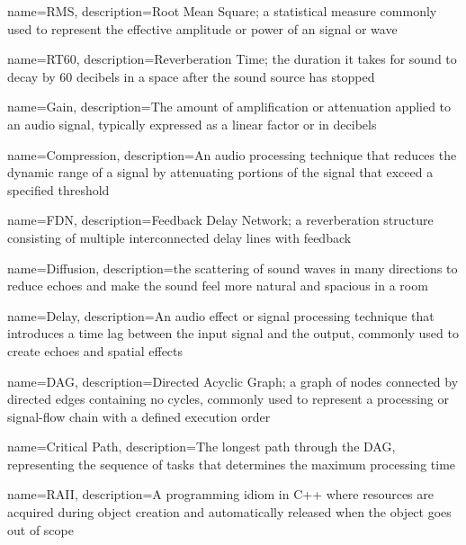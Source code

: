 {
    name={RMS},
    description={Root Mean Square; a statistical measure commonly used to represent the 
    effective amplitude or power of an signal or wave}
}

{
    name={RT60},
    description={Reverberation Time; the duration it takes for sound to decay by 60 decibels 
    in a space after the sound source has stopped}
}

{
    name={Gain},
    description={The amount of amplification or attenuation applied to an audio signal, typically expressed as a linear factor or in decibels}
}


{
    name={Compression},
    description={An audio processing technique that reduces the dynamic range of a signal by attenuating portions of the signal that exceed a specified threshold}
}

{
    name={FDN},
    description={Feedback Delay Network; a reverberation structure consisting of multiple 
    interconnected delay lines with feedback}
}

{
    name={Diffusion},
    description={the scattering of sound waves in many directions to 
    reduce echoes and make the sound feel more natural and spacious 
    in a room}
}

{
    name={Delay},
    description={An audio effect or signal processing technique that introduces a time lag between the input signal and the output, commonly used to create echoes and spatial effects}
}

{
    name={DAG},
    description={Directed Acyclic Graph; a graph of nodes connected by directed
        edges containing no cycles, commonly used to represent a
        processing or signal-flow chain with a defined execution
        order}
}


{
    name={Critical Path},
    description={The longest path through the DAG, representing the sequence of tasks 
    that determines the maximum processing time}
}

{
    name={RAII},
    description={A programming idiom in C++ where resources are acquired during 
    object creation and automatically released when the object goes out of scope}
}
